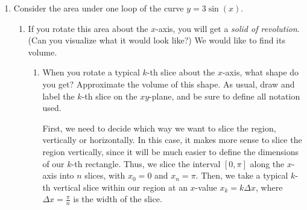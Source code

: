 \documentclass[main]{subfiles}
\begin{document}
\begin{enumerate}

   \item 
  
Consider the area under one loop of the curve $y=3\sin(x)$.
  
\begin{center}
\end{center}



\begin{enumerate}
    \item If you rotate this area about the $x$-axis, you will get a \textit{solid of revolution}. (Can you visualize what it would look like?) We would like to find its volume.

\begin{enumerate}

\item
\begin{problem}[1.25in]
When you rotate a typical $k$-th slice about the $x$-axis, what shape do you get? Approximate the volume of this shape. As usual, draw and label the $k$-th slice on the $xy$-plane, and be sure to define all notation used.
\end{problem}

\begin{solution}
First, we need to decide which way we want to slice the region, vertically or horizontally. In this case, it makes more sense to slice the region vertically, since it will be much easier to define the dimensions of our $k$-th rectangle. Thus, we slice the interval $[0,\pi]$ along the $x$-axis into $n$ slices, with $x_0=0$ and $x_n=\pi$. Then, we take a typical $k$-th vertical slice within our region at an $x$-value $x_k=k\Delta x$, where $\Delta x = \frac{\pi}{n}$ is the width of the slice. 


\end{solution}
\end{enumerate}
\end{enumerate}
\end{enumerate}
\end{document}
